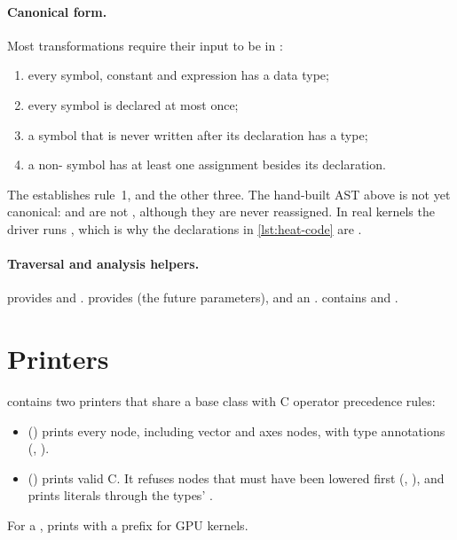 \paragraph{Canonical form.}
Most transformations require their input to be in :
\begin{enumerate}
  \item every symbol, constant and expression has a data type;
  \item every symbol is declared at most once;
  \item a symbol that is never written after its declaration has a  type;
  \item a non- symbol has at least one assignment besides its declaration.
\end{enumerate}
The  establishes rule~1, and  the other three.
The hand-built AST above is not yet canonical:  and  are not
, although they are never reassigned. In real kernels the driver runs
, which is why the declarations in \cref{lst:heat-code} are
.

\paragraph{Traversal and analysis helpers.}
 provides  and .
 provides  (the future
parameters),  and an .
 contains  and
.

\section{Printers}

 contains two printers that share a base class with C operator
precedence rules:
\begin{itemize}
  \item {} () prints every node, including vector and axes
        nodes, with type annotations (\code{[1.0: float64]}, ).
  \item {} () prints valid C. It refuses nodes that must
        have been lowered first (, ), and prints
        literals through the types' .
\end{itemize}
For a ,  prints  with a
 prefix for GPU kernels.

